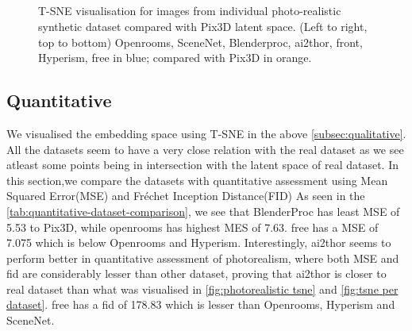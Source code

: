 \begin{figure}[!ht]
    \centering
    \resizebox{0.49\linewidth}{5cm}{}
    \resizebox{0.49\linewidth}{5cm}{}\\
    \resizebox{0.49\linewidth}{5cm}{}
    \resizebox{0.49\linewidth}{5cm}{}\\
    \resizebox{0.49\linewidth}{5cm}{}
    \resizebox{0.49\linewidth}{5cm}{}\\
    \resizebox{0.49\linewidth}{5cm}{}\\

    \caption{T-SNE visualisation for images from individual photo-realistic synthetic dataset compared with Pix3D latent space.
        (Left to right, top to bottom) Openrooms, SceneNet, Blenderproc, \gls{ai2thor}, \gls{front}, Hyperism, \gls{free} in blue;
        compared with Pix3D in orange.}
    \label{fig:tsne per dataset}
\end{figure}


\subsection{Quantitative}\label{subsec:quantitative}

We visualised the embedding space using T-SNE in the above \autoref{subsec:qualitative}.
All the datasets seem to have a very close relation with the real dataset as we see atleast some points being in intersection with the latent space of real dataset.
In this section,we compare the datasets with quantitative assessment using Mean Squared Error(MSE) and Fr\'echet Inception Distance(FID)
As seen in the \autoref{tab:quantitative-dataset-comparison}, we see that BlenderProc has least MSE of 5.53 to Pix3D,
while openrooms has highest MES of 7.63.
\gls{free} has a MSE of 7.075 which is below Openrooms and Hyperism.
Interestingly, \gls{ai2thor} seems to perform better in quantitative assessment of photorealism,
where both MSE and \gls{fid} are considerably lesser than other dataset,
proving that \gls{ai2thor} is closer to real dataset than what was visualised in \autoref{fig:photorealistic tsne} and \autoref{fig:tsne per dataset}.
\gls{free} has a \gls{fid} of 178.83 which is lesser than Openrooms, Hyperism and SceneNet.

